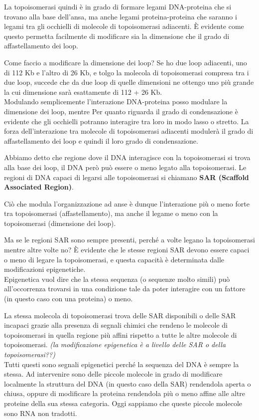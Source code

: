 \documentclass[11pt]{book}
\begin{document}
La topoisomerasi quindi è in grado di formare legami DNA-proteina che si trovano alla base dell’ansa, ma anche legami proteina-proteina che saranno i legami tra gli occhielli di molecole di topoisomerasi adiacenti. È evidente come questo permetta facilmente di modificare sia la dimensione che il grado di affastellamento dei loop.

Come faccio a modificare la dimensione dei loop?
Se ho due loop adiacenti, uno di 112 Kb e l’altro di 26 Kb, e tolgo la molecola di topoisomerasi compresa tra i due loop, succede che da due loop di quelle dimensioni ne ottengo uno più grande la cui dimensione sarà esattamente di 112 + 26 Kb.\\
Modulando semplicemente l’interazione DNA-proteina posso modulare la dimensione dei loop, mentre Per quanto riguarda il grado di condensazione è evidente che gli occhielli potranno interagire tra loro in modo lasso o stretto. La forza dell’interazione tra molecole di topoisomerasi adiacenti modulerà il grado di affastellamento dei loop e quindi il loro grado di condensazione.

Abbiamo detto che regione dove il DNA interagisce con la topoisomerasi si trova alla base dei loop, il DNA però può essere o meno legato alla topoisomerasi. Le regioni di DNA capaci di legarsi alle topoisomerasi si chiamano \textbf{SAR (Scaffold Associated Region)}.

Ciò che modula l'organizzazione ad anse è dunque l’interazione più o meno forte tra topoisomerasi (affastellamento), ma anche il legame o meno con la topoisomerasi (dimensione dei loop).

Ma se le regioni SAR sono sempre presenti, perché a volte legano la topoisomerasi  mentre altre volte no? È evidente che le stesse regioni SAR devono essere capaci o meno di legare la topoisomerasi, e questa capacità è determinata dalle modificazioni epigenetiche.\\
Epigenetica vuol dire che la stessa sequenza (o sequenze molto simili) può all’occorrenza trovarsi in una condizione tale da poter interagire con un fattore (in questo caso con una proteina) o meno.

La stessa molecola di topoisomerasi trova delle SAR disponibili o delle SAR incapaci grazie alla presenza di segnali chimici che rendeno le molecole di topoisomerasi in quella regione più affini rispetto a tutte le altre molecole di topoisomerasi. \emph{(la modificazione epigenetica è a livello delle SAR o della topoisomerasi??)}\\
Tutti questi sono segnali epigenetici perché la sequenza del DNA è sempre la stessa. Ad intervenire sono delle piccole molecole in grado di modificare localmente la struttura del DNA (in questo caso della SAR) rendendola aperta o chiusa, oppure di modificare la proteina rendendola più o meno affine alle altre proteine della sua stessa categoria.
Oggi sappiamo che queste piccole molecole sono RNA non tradotti. 
\end{document}

